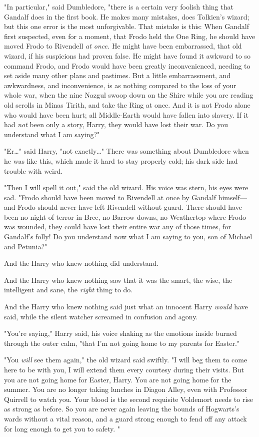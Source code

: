 "In particular," said Dumbledore, "there is a certain very foolish thing that 
Gandalf does in the first book. He makes many mistakes, does Tolkien's wizard; 
but this one error is the most unforgivable. That mistake is this: When Gandalf 
first suspected, even for a moment, that Frodo held the One Ring, he should 
have moved Frodo to Rivendell \emph{at once.} He might have been embarrassed, 
that old wizard, if his suspicions had proven false. He might have found it 
awkward to so command Frodo, and Frodo would have been greatly inconvenienced, 
needing to set aside many other plans and pastimes. But a little embarrassment, 
and awkwardness, and inconvenience, is as nothing compared to the loss of your 
whole war, when the nine Nazgul swoop down on the Shire while you are reading 
old scrolls in Minas Tirith, and take the Ring at once. And it is not Frodo 
alone who would have been hurt; all Middle-Earth would have fallen into 
slavery. If it had \emph{not} been only a story, Harry, they would have lost 
their war. Do you understand what I am saying?"

"Er{\ldots}" said Harry, "not exactly{\ldots}" There was something about 
Dumbledore when he was like this, which made it hard to stay properly cold; his 
dark side had trouble with weird.

"Then I will spell it out," said the old wizard. His voice was stern, his eyes 
were sad. "Frodo should have been moved to Rivendell at once by Gandalf 
himself---and Frodo should never have left Rivendell without guard. There 
should have been no night of terror in Bree, no Barrow-downs, no Weathertop 
where Frodo was wounded, they could have lost their entire war any of those 
times, for Gandalf's folly! Do you understand now what I am saying to you, son 
of Michael and Petunia?"

And the Harry who knew nothing did understand.

And the Harry who knew nothing saw that it was the smart, the wise, the 
intelligent and sane, the \emph{right} thing to do.

And the Harry who knew nothing said just what an innocent Harry \emph{would} 
have said, while the silent watcher screamed in confusion and agony.

"You're saying," Harry said, his voice shaking as the emotions inside burned 
through the outer calm, "that I'm not going home to my parents for Easter."

"You \emph{will} see them again," the old wizard said swiftly. "I will beg them 
to come here to be with you, I will extend them every courtesy during their 
visits. But you are not going home for Easter, Harry. You are not going home 
for the summer. You are no longer taking lunches in Diagon Alley, even with 
Professor Quirrell to watch you. Your blood is the second requisite Voldemort 
needs to rise as strong as before. So you are never again leaving the bounds of 
Hogwarts's wards without a vital reason, and a guard strong enough to fend off 
any attack for long enough to get you to safety. "

